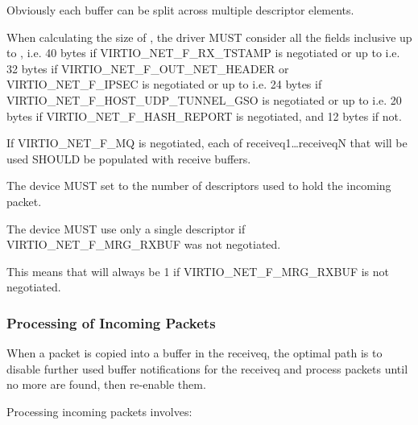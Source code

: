 \begin{note}
Obviously each buffer can be split across multiple descriptor elements.
\end{note}

When calculating the size of , the driver
MUST consider all the fields inclusive up to ,
i.e. 40 bytes if VIRTIO_NET_F_RX_TSTAMP is negotiated or up to 
i.e. 32 bytes if VIRTIO_NET_F_OUT_NET_HEADER or VIRTIO_NET_F_IPSEC is negotiated or up to 
i.e. 24 bytes if VIRTIO_NET_F_HOST_UDP_TUNNEL_GSO is negotiated or up to 
i.e. 20 bytes if VIRTIO_NET_F_HASH_REPORT is negotiated, and 12 bytes if not.

If VIRTIO_NET_F_MQ is negotiated, each of receiveq1\ldots receiveqN
that will be used SHOULD be populated with receive buffers.


The device MUST set  to the number of descriptors used to
hold the incoming packet.

The device MUST use only a single descriptor if VIRTIO_NET_F_MRG_RXBUF
was not negotiated.
\begin{note}
{This means that  will always be 1
if VIRTIO_NET_F_MRG_RXBUF is not negotiated.}
\end{note}

\subsubsection{Processing of Incoming Packets}\label{sec:Device Types / Network Device / Device Operation / Processing of Incoming Packets}
\label{sec:Device Types / Network Device / Device Operation / Processing of Packets}%

When a packet is copied into a buffer in the receiveq, the
optimal path is to disable further used buffer notifications for the
receiveq and process packets until no more are found, then re-enable
them.

Processing incoming packets involves:

